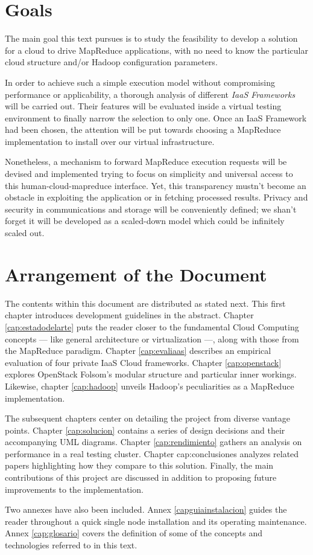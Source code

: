\section{Goals}\label{sec:objetivos}
\noindent The main goal this text pursues is to study the feasibility to develop a solution for a cloud to drive MapReduce applications, with no need to know the particular cloud structure and/or Hadoop configuration parameters.

In order to achieve such a simple execution model without compromising performance or applicability, a thorough analysis of different \emph{IaaS Frameworks} will be carried out. Their features will be evaluated inside a virtual testing environment to finally narrow the selection to only one. Once an IaaS Framework had been chosen, the attention will be put towards choosing a MapReduce implementation to install over our virtual infrastructure.

Nonetheless, a mechanism to forward MapReduce execution requests will be devised and implemented trying to focus on simplicity and universal access to this human-cloud-mapreduce interface. Yet, this transparency mustn't become an obstacle in exploiting the application or in fetching processed results. Privacy and security in communications and storage will be conveniently defined; we shan't forget it will be developed as a scaled-down model which could be infinitely scaled out.

\section{Arrangement of the Document}\label{sec:organizacion}
\noindent The contents within this document are distributed as stated next. This first chapter introduces development guidelines in the abstract. Chapter \ref{cap:estadodelarte} puts the reader closer to the fundamental Cloud Computing concepts --- like general architecture or virtualization ---, along with those from the MapReduce paradigm. Chapter \ref{cap:evaliaas} describes an empirical evaluation of four private IaaS Cloud frameworks. Chapter \ref{cap:openstack} explores OpenStack Folsom's modular structure and particular inner workings. Likewise, chapter \ref{cap:hadoop} unveils Hadoop's peculiarities as a MapReduce implementation.

The subsequent chapters center on detailing the project from diverse vantage points. Chapter \ref{cap:solucion} contains a series of design decisions and their accompanying UML diagrams. Chapter \ref{cap:rendimiento} gathers an analysis on performance in a real testing cluster. Chapter {cap:conclusiones} analyzes related papers highlighting how they compare to this solution. Finally, the main contributions of this project are discussed in addition to proposing future improvements to the implementation.

Two annexes have also been included. Annex \ref{capguiainstalacion} guides the reader throughout a quick single node installation and its operating maintenance. Annex \ref{cap:glosario} covers the definition of some of the concepts and technologies referred to in this text.
